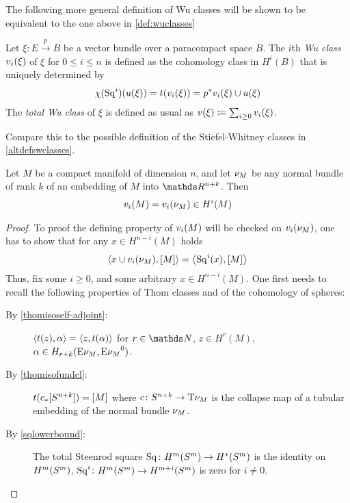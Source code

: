 The following more general definition of Wu classes
will be shown to be equivalent to the one above in \ref{def:wuclasses}
\begin{Def}
  Let $\xi\colon E\xrightarrow{p} B$ be a vector bundle over a
  paracompact space $B$.
  The $i$th \emph{Wu class} $v_i(\xi)$ of $\xi$ for $0\leq i\leq n$
  is defined as the cohomology class in $H^i(B)$ that is uniquely
  determined by
  \begin{gather*}
    \chi(\mathrm{Sq}^{i})(u(\xi)) = t(v_i(\xi)) = {p}^* v_i(\xi) \cup u(\xi)
  \end{gather*}
  The \emph{total Wu class} of $\xi$ is defined as usual as
  $v(\xi)\coloneqq\sum_{i\geq0}v_i(\xi)$.
\end{Def}
\begin{Rem}
  Compare this to the possible definition of the Stiefel-Whitney
  classes in \autoref{altdefswclasses}.
\end{Rem}

\begin{Thm}\label{altdefwuclasses}
  Let $M$ be a compact manifold of dimension $n$, and let $\nu_{M}$ be
  any normal bundle of rank $k$ of an embedding of $M$ into
  $\R^{n+k}$. Then
  \begin{gather*}
    v_i(M) = v_i(\nu_{M})\in H^i(M)
  \end{gather*}
  \begin{proof}
    To proof  the defining property of
    $v_i(M)$ will be checked on $v_i(\nu_{M})$, \idest one has to show
    that for any $x\in H^{n-i}(M)$ holds
    \begin{gather*}
      \left\langle x\cup v_i(\nu_{M}), [M] \right\rangle
      = \left\langle \mathrm{Sq}^{i}(x), [M] \right\rangle
    \end{gather*}
    Thus, fix some $i\geq0$, and some arbitrary $x\in H^{n-i}(M)$.
    One first needs to recall the following properties of Thom classes
    and of the cohomology of spheres:
    \begin{description}
    \item[By \autoref{thomisoself-adjoint}:]
      $\left\langle t(z), \alpha \right\rangle = \left\langle z, t(\alpha) \right\rangle$
      for $r\in\Nat$, $z\in H^r(M)$,
      $\alpha\in H_{r+k}(\mathrm{E}\nu_{M}, {\mathrm{E}\nu_{M}}^0)$.
    \item[By \autoref{thomisofundcl}:]
      $t({c}_*[S^{n+k}]) = [M]$
      where $c\colon S^{n+k}\to \mathrm{T}{\nu_{M}}$ is
      the collapse map of a tubular embedding of the normal bundle $\nu_{M}$.
    \item[By \autoref{sqlowerbound}:]
      The total Steenrod square
      $\mathrm{Sq}^{}\colon H^m(S^{m})
      \to H^*(S^{m})$
      is the identity on $H^m(S^{m})$, \idest
      $\mathrm{Sq}^{i}\colon H^m(S^{m})\to H^{m+i}(S^{m})$ is zero for $i\neq0$.
    \end{description}
  \end{proof}
\end{Thm}

